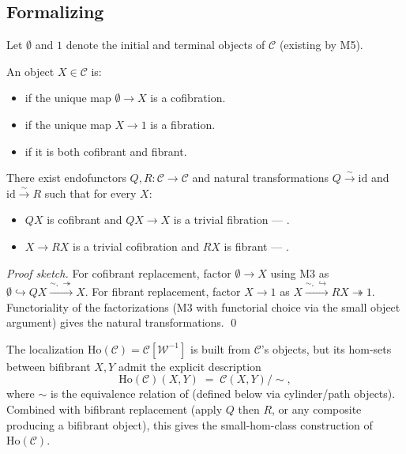 \subsection{Formalizing}

Let $\emptyset$ and $1$ denote the initial and terminal objects of
$\mathcal{C}$ (existing by M5).

\begin{definition}
\label{def:cofib-fib}
An object $X \in \mathcal{C}$ is:
\begin{itemize}
  \item {} if the unique map $\emptyset \to X$ is a cofibration.
  \item {} if the unique map $X \to 1$ is a fibration.
  \item {} if it is both cofibrant and fibrant.
\end{itemize}
\end{definition}

\begin{theorem}
\label{thm:replacement}
There exist endofunctors $Q, R : \mathcal{C} \to \mathcal{C}$ and
natural transformations $Q \xrightarrow{\sim} \mathrm{id}$ and
$\mathrm{id} \xrightarrow{\sim} R$ such that for every $X$:
\begin{itemize}
  \item $Q X$ is cofibrant and $Q X \to X$ is a trivial fibration —
        .
  \item $X \to R X$ is a trivial cofibration and $R X$ is fibrant —
        .
\end{itemize}
\end{theorem}

\begin{proof}[Proof sketch]
For cofibrant replacement, factor $\emptyset \to X$ using M3 as
$\emptyset \hookrightarrow Q X \xrightarrow{\sim,\,\twoheadrightarrow} X$.
For fibrant replacement, factor $X \to 1$ as
$X \xrightarrow{\sim,\,\hookrightarrow} R X \twoheadrightarrow 1$.
Functoriality of the factorizations (M3 with functorial choice via the
small object argument) gives the natural transformations. \qed
\end{proof}

\begin{remark}
The localization $\mathrm{Ho}(\mathcal{C}) = \mathcal{C}[\mathcal{W}^{-1}]$
is built from $\mathcal{C}$'s objects, but its hom-sets between
bifibrant $X, Y$ admit the explicit description
\begin{equation*}
  \mathrm{Ho}(\mathcal{C})(X, Y) \;=\; \mathcal{C}(X, Y) / \sim,
\end{equation*}
where $\sim$ is the equivalence relation of  (defined below
via cylinder/path objects). Combined with bifibrant replacement (apply
$Q$ then $R$, or any composite producing a bifibrant object), this
gives the small-hom-class construction of $\mathrm{Ho}(\mathcal{C})$.
\end{remark}

